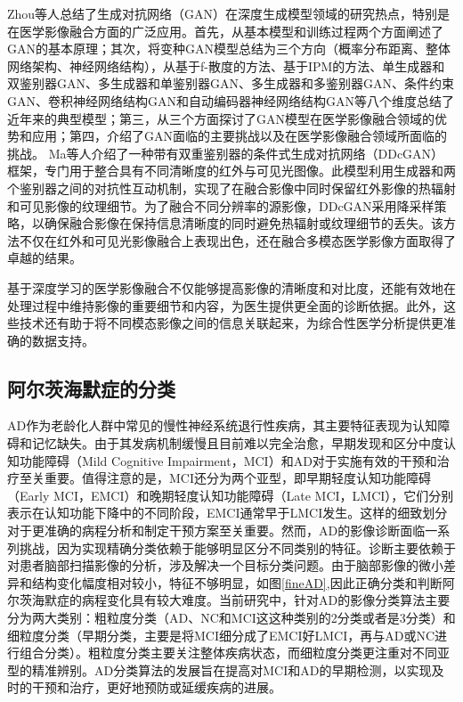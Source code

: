 Zhou等人\cite{zhou2023gan}总结了生成对抗网络（GAN）在深度生成模型领域的研究热点，特别是在医学影像融合方面的广泛应用。首先，从基本模型和训练过程两个方面阐述了GAN的基本原理；其次，将变种GAN模型总结为三个方向（概率分布距离、整体网络架构、神经网络结构），从基于f-散度的方法、基于IPM的方法、单生成器和双鉴别器GAN、多生成器和单鉴别器GAN、多生成器和多鉴别器GAN、条件约束GAN、卷积神经网络结构GAN和自动编码器神经网络结构GAN等八个维度总结了近年来的典型模型；第三，从三个方面探讨了GAN模型在医学影像融合领域的优势和应用；第四，介绍了GAN面临的主要挑战以及在医学影像融合领域所面临的挑战。
Ma等人\cite{ma2020ddcgan}介绍了一种带有双重鉴别器的条件式生成对抗网络（DDcGAN）框架，专门用于整合具有不同清晰度的红外与可见光图像。此模型利用生成器和两个鉴别器之间的对抗性互动机制，实现了在融合影像中同时保留红外影像的热辐射和可见影像的纹理细节。为了融合不同分辨率的源影像，DDcGAN采用降采样策略，以确保融合影像在保持信息清晰度的同时避免热辐射或纹理细节的丢失。该方法不仅在红外和可见光影像融合上表现出色，还在融合多模态医学影像方面取得了卓越的结果。

基于深度学习的医学影像融合不仅能够提高影像的清晰度和对比度，还能有效地在处理过程中维持影像的重要细节和内容，为医生提供更全面的诊断依据。此外，这些技术还有助于将不同模态影像之间的信息关联起来，为综合性医学分析提供更准确的数据支持。

\subsection{阿尔茨海默症的分类}
AD作为老龄化人群中常见的慢性神经系统退行性疾病，其主要特征表现为认知障碍和记忆缺失。由于其发病机制缓慢且目前难以完全治愈，早期发现和区分中度认知功能障碍（Mild Cognitive Impairment，MCI）和AD对于实施有效的干预和治疗至关重要。值得注意的是，MCI还分为两个亚型，即早期轻度认知功能障碍（Early MCI，EMCI）和晚期轻度认知功能障碍（Late MCI，LMCI），它们分别表示在认知功能下降中的不同阶段，EMCI通常早于LMCI发生。这样的细致划分对于更准确的病程分析和制定干预方案至关重要。然而，AD的影像诊断面临一系列挑战，因为实现精确分类依赖于能够明显区分不同类别的特征。诊断主要依赖于对患者脑部扫描影像的分析，涉及解决一个目标分类问题。由于脑部影像的微小差异和结构变化幅度相对较小，特征不够明显，如图\ref{fineAD},因此正确分类和判断阿尔茨海默症的病程变化具有较大难度。当前研究中，针对AD的影像分类算法主要分为两大类别：粗粒度分类（AD、NC和MCI这这种类别的2分类或者是3分类）和细粒度分类（早期分类，主要是将MCI细分成了EMCI好LMCI，再与AD或NC进行组合分类）。粗粒度分类主要关注整体疾病状态，而细粒度分类更注重对不同亚型的精准辨别。AD分类算法的发展旨在提高对MCI和AD的早期检测，以实现及时的干预和治疗，更好地预防或延缓疾病的进展。

